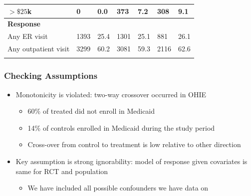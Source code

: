 \documentclass{beamer}
\begin{document}
\begin{frame}
{\begin{singlespace}
\begin{landscape}
\begin{longtable}{lllllll}
\hspace{3mm} $>\$25$k & 0 & 0.0 & 373 & 7.2 & 308 & 9.1 \\
   \hline
\hline
 \textbf{Response} &   &  &  & &  &  \\ 
\hspace{3mm}Any ER visit &  1393 & 25.4 & 1301 & 25.1 & 881 & 26.1 \\ 
\hspace{3mm}Any outpatient visit & 3299 & 60.2 & 3081 & 59.3 & 2116 & 62.6 \\ 
\hline
\hline
\label{rct-nrt-compare}
\end{longtable}
\end{landscape}
\end{singlespace}
}
\end{frame}

\begin{frame}
\frametitle{Checking Assumptions} 
\begin{itemize}
\item Monotonicity is violated: two-way crossover occurred in OHIE
\begin{itemize}
\item 60\% of treated did not enroll in Medicaid 
\item 14\% of controls enrolled in Medicaid during the study period
\item Cross-over from control to treatment is low relative to other direction
\end{itemize}
\item Key assumption is strong ignorability: model of response given covariates is same for RCT and population
\begin{itemize}
\item We have included all possible confounders we have data on
\end{itemize}
\end{itemize}
\end{frame}
\end{document}
